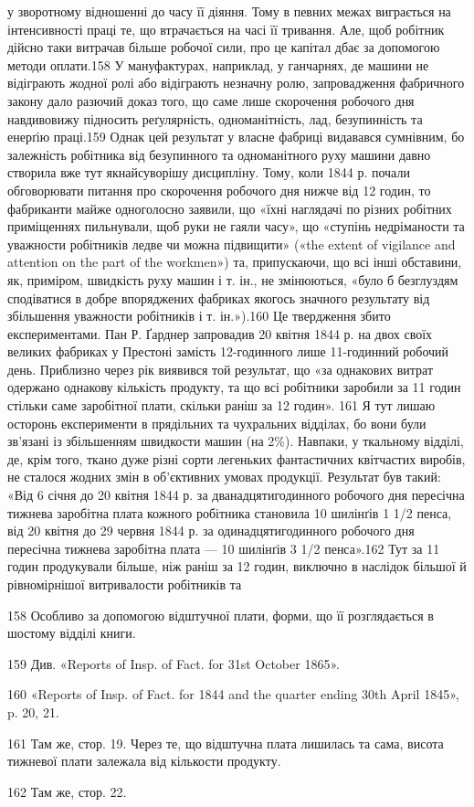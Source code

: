 у зворотному відношенні до часу її діяння. Тому в певних межах
виграється на інтенсивності праці те, що втрачається на часі її
тривання. Але, щоб робітник дійсно таки витрачав більше робочої
сили, про це капітал дбає за допомогою методи оплати.158 У мануфактурах,
наприклад, у ганчарнях, де машини не відіграють
жодної ролі або відіграють незначну ролю, запровадження фабричного
закону дало разючий доказ того, що саме лише скорочення
робочого дня навдивовижу підносить реґулярність, одноманітність,
лад, безупинність та енерґію праці.159 Однак цей результат
у власне фабриці видавався сумнівним, бо залежність робітника
від безупинного та одноманітного руху машини давно створила
вже тут якнайсуворішу дисципліну. Тому, коли 1844 р.
почали обговорювати питання про скорочення робочого дня
нижче від 12 годин, то фабриканти майже одноголосно заявили,
що «їхні наглядачі по різних робітних приміщеннях пильнували,
щоб руки не гаяли часу», що «ступінь недріманости та уважности
робітників ледве чи можна підвищити» («the extent of vigilance
and attention on the part of the workmen») та, припускаючи, що всі
інші обставини, як, приміром, швидкість руху машин і т. ін.,
не змінюються, «було б безглуздям сподіватися в добре впоряджених
фабриках якогось значного результату від збільшення
уважности робітників і т. ін.»).160 Це твердження збито експериментами.
Пан Р. Ґарднер запровадив 20 квітня 1844 р. на двох
своїх великих фабриках у Престоні замість 12-годинного лише
11-годинний робочий день. Приблизно через рік виявився
той результат, що «за однакових витрат одержано однакову
кількість продукту, та що всі робітники заробили за 11 годин
стільки саме заробітної плати, скільки раніш за 12 годин». 161
Я тут лишаю осторонь експерименти в прядільних та чухральних
відділах, бо вони були зв’язані із збільшенням швидкости машин
(на 2\%). Навпаки, у ткальному відділі, де, крім того, ткано
дуже різні сорти легеньких фантастичних квітчастих виробів,
не сталося жодних змін в об’єктивних умовах продукції. Результат
був такий: «Від 6 січня до 20 квітня 1844 р. за дванадцятигодинного
робочого дня пересічна тижнева заробітна плата кожного
робітника становила 10 шилінґів 1 1/2 пенса, від 20 квітня до
29 червня 1844 р. за одинадцятигодинного робочого дня пересічна
тижнева заробітна плата — 10 шилінґів 3 1/2 пенса».162 Тут за
11 годин продукували більше, ніж раніш за 12 годин, виключно
в наслідок більшої й рівномірнішої витривалости робітників та

158 Особливо за допомогою відштучної плати, форми, що її розглядається
в шостому відділі книги.

159 Див. «Reports of Insp. of Fact. for 31st October 1865».

160 «Reports of Insp. of Fact. for 1844 and the quarter ending 30th
April 1845», p. 20, 21.

161 Там же, стор. 19. Через те, що відштучна плата лишилась та
сама, висота тижневої плати залежала від кількости продукту.

162 Там же, стор. 22.
